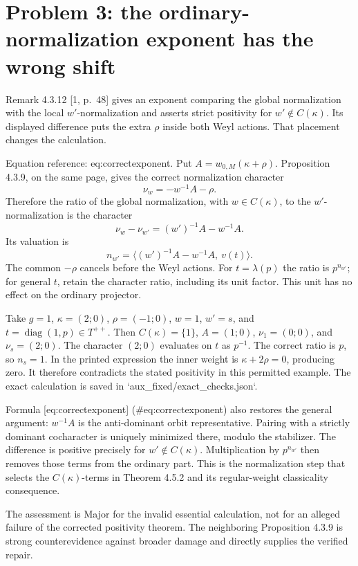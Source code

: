 \documentclass[10pt]{article}
\begin{document}
\section*{Problem 3: the ordinary-normalization exponent has the wrong shift}
Remark 4.3.12 [1, p. 48] gives an exponent comparing the global normalization with the local \(w'\)-normalization and asserts strict positivity for \(w'\notin C(\kappa)\). Its displayed difference puts the extra \(\rho\) inside both Weyl actions. That placement changes the calculation.\par
Equation reference: eq:correctexponent. Put \(A=w_{0,M}(\kappa+\rho)\). Proposition 4.3.9, on the same page, gives the correct normalization character \[\nu_w=-w^{-1}A-\rho.\] Therefore the ratio of the global normalization, with \(w\in C(\kappa)\), to the \(w'\)-normalization is the character \[\nu_w-\nu_{w'}=(w')^{-1}A-w^{-1}A.\] Its valuation is \[
 n_{w'}=\bigl\langle (w')^{-1}A-w^{-1}A,\ v(t)\bigr\rangle.\] The common \(-\rho\) cancels before the Weyl actions. For \(t=\lambda(p)\) the ratio is \(p^{n_{w'}}\); for general \(t\), retain the character ratio, including its unit factor. This unit has no effect on the ordinary projector.\par
Take \(g=1\), \(\kappa=(2;0)\), \(\rho=(-1;0)\), \(w=1\), \(w'=s\), and \(t=\operatorname{diag}(1,p)\in T^{++}\). Then \(C(\kappa)=\{1\}\), \(A=(1;0)\), \(\nu_1=(0;0)\), and \(\nu_s=(2;0)\). The character \((2;0)\) evaluates on \(t\) as \(p^{-1}\). The correct ratio is \(p\), so \(n_s=1\). In the printed expression the inner weight is \(\kappa+2\rho=0\), producing zero. It therefore contradicts the stated positivity in this permitted example. The exact calculation is saved in `aux\_fixed/exact\_checks.json`.\par
Formula [eq:correctexponent] (\#eq:correctexponent) also restores the general argument: \(w^{-1}A\) is the anti-dominant orbit representative. Pairing with a strictly dominant cocharacter is uniquely minimized there, modulo the stabilizer. The difference is positive precisely for \(w'\notin C(\kappa)\). Multiplication by \(p^{n_{w'}}\) then removes those terms from the ordinary part. This is the normalization step that selects the \(C(\kappa)\)-terms in Theorem 4.5.2 and its regular-weight classicality consequence.\par
The assessment is Major for the invalid essential calculation, not for an alleged failure of the corrected positivity theorem. The neighboring Proposition 4.3.9 is strong counterevidence against broader damage and directly supplies the verified repair.\par
\end{document}
